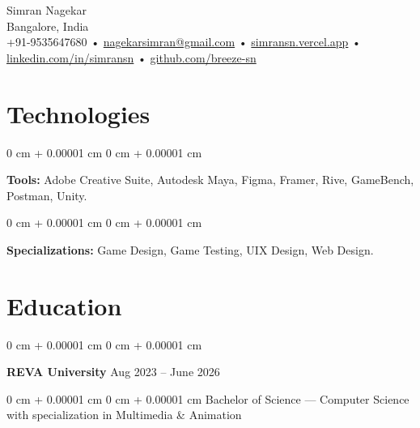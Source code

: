 \documentclass[10pt, letterpaper]{article}
\newenvironment{onecolentry}{
    \begin{adjustwidth}{
        0 cm + 0.00001 cm
    }{
        0 cm + 0.00001 cm
    }
}{
    \end{adjustwidth}
} %
\newenvironment{twocolentry}[2][]{
    \onecolentry
    \def\secondColumn{#2}
    \setcolumnwidth{\fill, 4.5 cm}
    \begin{paracol}{2}
}{
    \switchcolumn \raggedleft \secondColumn
    \end{paracol}
    \endonecolentry
} %
\newenvironment{header}{
    \setlength{\topsep}{0pt}\par\kern\topsep\raggedright\linespread{1.5}
}{
    \par\kern\topsep
} %
\begin{document}
    \newcommand{\AND}{\unskip
        \cleaders\copy\ANDbox\hskip\wd\ANDbox
        \ignorespaces
    }
    \newsavebox\ANDbox
    \sbox\ANDbox{$|$}

    \begin{header}
    {\color{secondaryColor} \fontsize{25pt}{25pt}\selectfont Simran Nagekar}\\
    \vspace{1pt}
    Bangalore, India\\
    \vspace{2pt}
     \color{secondaryColor}  +91-9535647680 • \href{mailto:nagekarsimran@gmail.com}{\color{secondaryColor}nagekarsimran@gmail.com} • \href{https://simransn.vercel.app/}{\color{secondaryColor}simransn.vercel.app} •
    \href{https://linkedin.com/in/simransn}{\color{secondaryColor}linkedin.com/in/simransn} •
    \href{https://github.com/breeze-sn}{\color{secondaryColor}github.com/breeze-sn}  
\end{header}

    \vspace{5 pt - 0.3 cm}

     
    \section{\color{secondaryColor}Technologies}


        \vspace{0.1 cm}

        \begin{onecolentry}
            \textbf{Tools:} Adobe Creative Suite, Autodesk Maya, Figma, Framer, Rive, GameBench, Postman, Unity.
        \end{onecolentry}

        \vspace{0.1 cm}

        \begin{onecolentry}
            \textbf{Specializations:} Game Design, Game Testing, UIX Design, Web Design.
        \end{onecolentry}


    \section{\color{secondaryColor}Education} 
        \begin{twocolentry}{
            Aug 2023 – June 2026
        }
            \textbf{REVA University}\end{twocolentry}
            \begin{onecolentry} Bachelor of Science — Computer Science with specialization in Multimedia \& Animation \end{onecolentry}
\end{document}
